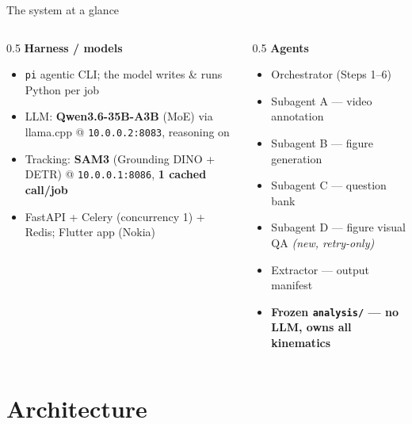\documentclass[10pt,aspectratio=169]{beamer}
\newcommand{\gd}[1]{\textcolor{good}{#1}}
\begin{document}
\begin{frame}{The system at a glance}
\begin{columns}[T]
\begin{column}{0.5\textwidth}
\textbf{Harness / models}
\begin{itemize}\scriptsize
  \item \texttt{pi} agentic CLI; the model writes \& runs Python per job
  \item LLM: \textbf{Qwen3.6-35B-A3B} (MoE) via llama.cpp @ \texttt{10.0.0.2:8083}, reasoning on
  \item Tracking: \textbf{SAM3} (Grounding DINO + DETR) @ \texttt{10.0.0.1:8086}, \textbf{1 cached call/job}
  \item FastAPI + Celery (concurrency 1) + Redis; Flutter app (Nokia)
\end{itemize}
\end{column}
\begin{column}{0.5\textwidth}
\textbf{Agents}
\begin{itemize}\scriptsize
  \item Orchestrator (Steps 1--6)
  \item Subagent A --- video annotation
  \item Subagent B --- figure generation
  \item Subagent C --- question bank
  \item Subagent D --- figure visual QA \emph{(new, retry-only)}
  \item Extractor --- output manifest
  \item \gd{\textbf{Frozen \texttt{analysis/} --- no LLM, owns all kinematics}}
\end{itemize}
\end{column}
\end{columns}
\end{frame}

\section{Architecture}
\end{document}
